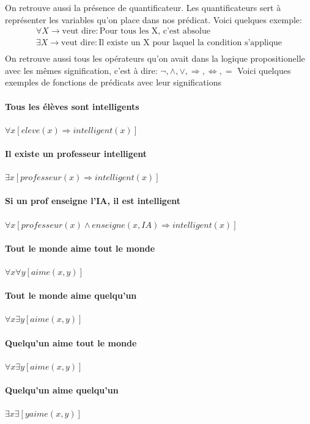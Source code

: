 \documentclass[oneside]{book}
\begin{document}
\noindent On retrouve aussi la présence de quantificateur. Les quantificateurs sert à représenter les variables qu'on place dans nos prédicat. Voici quelques exemple:
\begin{align}
\forall X \rightarrow \text{veut dire}: \text{Pour tous les X, c'est absolue}\\
\exists X \rightarrow \text{veut dire}: \text{Il existe un X pour laquel la condition s'applique}\\
\end{align}
\noindent On retrouve aussi tous les opérateurs qu'on avait dans la logique propositionelle avec les mêmes signification, c'est à dire: $\neg , \wedge , \vee , \Rightarrow , \Leftrightarrow , =$
\noindent Voici quelques exemples de fonctions de prédicats avec leur significations

\paragraph{Tous les élèves sont intelligents} $\forall x [eleve(x) \Rightarrow intelligent(x)]$
\paragraph{Il existe un professeur intelligent} $\exists x [professeur(x) \Rightarrow intelligent(x)]$
\paragraph{Si un prof enseigne l'IA, il est intelligent} $\forall x [professeur(x) \wedge enseigne(x, IA) \Rightarrow intelligent(x)]$
\paragraph{Tout le monde aime tout le monde}$\forall x \forall y [aime(x,y)]$
\paragraph{Tout le monde aime quelqu'un}$\forall x \exists y [aime(x,y)]$
\paragraph{Quelqu'un aime tout le monde}$\forall x \exists y [aime(x,y)]$
\paragraph{Quelqu'un aime quelqu'un}$\exists x \exists [y aime(x,y)]$
\end{document}
